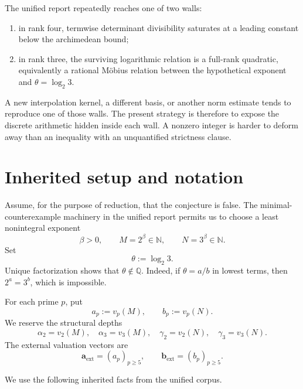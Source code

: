 \documentclass[11pt,oneside]{article}
\theoremstyle{research}
\theoremstyle{definition}
\newcommand{\Q}{\mathbb Q}
\newcommand{\N}{\mathbb N}
\newcommand{\ext}{\mathrm{ext}}
\newcommand{\defeq}{\mathrel{:=}}
\begin{document}
The unified report repeatedly reaches one of two walls:
\begin{enumerate}[label=(\roman*),leftmargin=2em]
\item in rank four, termwise determinant divisibility saturates at a leading
      constant below the archimedean bound;
\item in rank three, the surviving logarithmic relation is a full-rank
      quadratic, equivalently a rational M\"obius relation between the
      hypothetical exponent and $\theta=\log_2 3$.
\end{enumerate}
A new interpolation kernel, a different basis, or another norm estimate tends
to reproduce one of those walls.  The present strategy is therefore to expose
the discrete arithmetic hidden inside each wall.  A nonzero integer is harder
to deform away than an inequality with an unquantified strictness clause.

\section{Inherited setup and notation}
\label{sec:setup}

Assume, for the purpose of reduction, that the conjecture is false.  The
minimal-counterexample machinery in the unified report permits us to choose a
least nonintegral exponent
\[
  \beta>0,
  \qquad M=2^\beta\in\N,
  \qquad N=3^\beta\in\N.
\]
Set
\[
  \theta\defeq\log_2 3.
\]
Unique factorization shows that $\theta\notin\Q$.  Indeed, if
$\theta=a/b$ in lowest terms, then $2^a=3^b$, which is impossible.

For each prime $p$, put
\[
  a_p\defeq v_p(M),\qquad b_p\defeq v_p(N).
\]
We reserve the structural depths
\[
 \alpha_2=v_2(M),\quad \alpha_3=v_3(M),\quad
 \gamma_2=v_2(N),\quad \gamma_3=v_3(N).
\]
The external valuation vectors are
\[
 \mathbf a_{\ext}=(a_p)_{p\ge5},\qquad
 \mathbf b_{\ext}=(b_p)_{p\ge5}.
\]

We use the following inherited facts from the unified corpus.
\end{document}

